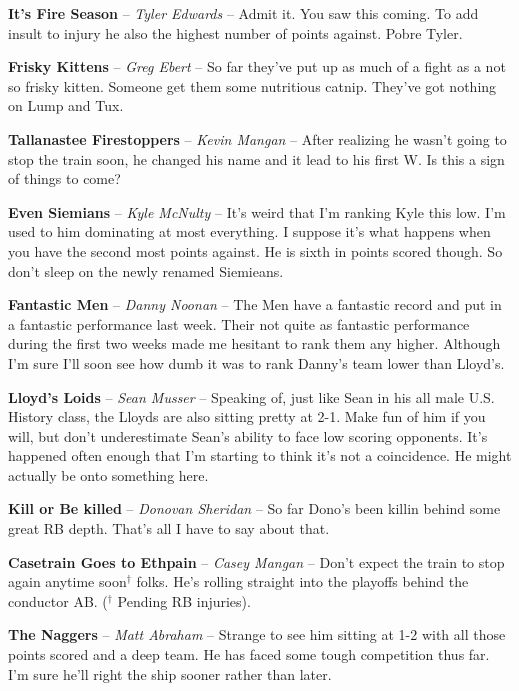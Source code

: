 \documentclass[11pt,letterpaper]{article}
\begin{document}
\newpage
{}
\begin{etaremune}
\item \textbf{It's Fire Season} -- \textit{Tyler Edwards} -- Admit it. You saw this coming. To add insult to injury he also the highest number of points against. Pobre Tyler.
\item \textbf{Frisky Kittens} -- \textit{Greg Ebert} -- So far they've put up as much of a fight as a not so frisky kitten. Someone get them some nutritious catnip. They’ve got nothing on Lump and Tux. 
\item \textbf{Tallanastee Firestoppers} -- \textit{Kevin Mangan} -- After realizing he wasn't going to stop the train soon, he changed his name and it lead to his first W. Is this a sign of things to come? 
\item \textbf{Even Siemians} -- \textit{Kyle McNulty} -- It's weird that I'm ranking Kyle this low. I'm used to him dominating at most everything. I suppose it's what happens when you have the second most points against. He is sixth in points scored though. So don't sleep on the newly renamed Siemieans. 
\item \textbf{Fantastic Men} -- \textit{Danny Noonan} -- The Men have a fantastic record and put in a fantastic performance last week. Their not quite as fantastic performance during the first two weeks made me hesitant to rank them any higher. Although I'm sure I'll soon see how dumb it was to rank Danny's team lower than Lloyd's.
\item \textbf{Lloyd's Loids} -- \textit{Sean Musser} -- Speaking of, just like Sean in his all male U.S. History class, the Lloyds are also sitting pretty at 2-1. Make fun of him if you will, but don't underestimate Sean's ability to face low scoring opponents. It's happened often enough that I'm starting to think it's not a coincidence. He might actually be onto something here. 
\item \textbf{Kill or Be killed} -- \textit{Donovan Sheridan} -- So far Dono's been killin behind some great RB depth. That's all I have to say about that. 
\item \textbf{Casetrain Goes to Ethpain} -- \textit{Casey Mangan} -- Don't expect the train to stop again anytime soon$^\dag$ folks. He's rolling straight into the playoffs behind the conductor AB. ($^\dag$ Pending RB injuries).
\item \textbf{The Naggers} -- \textit{Matt Abraham} -- Strange to see him sitting at 1-2 with all those points scored and a deep team. He has faced some tough competition thus far. I'm sure he'll right the ship sooner rather than later. 

\end{etaremune}
\end{document}
